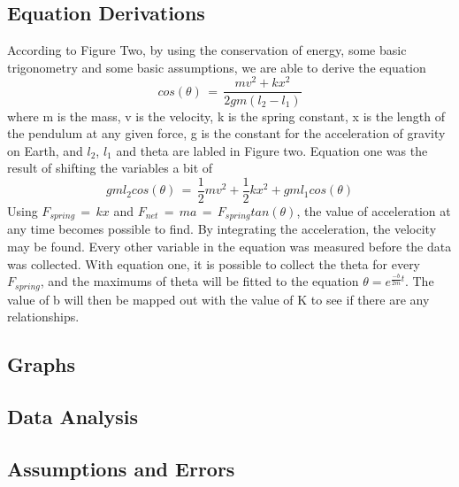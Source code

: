 \documentclass{report}
\begin{document}
\subsection*{Equation Derivations}
\indent According to Figure Two, by using the conservation of energy, some basic trigonometry and some basic assumptions, we are able to derive the equation
\begin{equation}
cos(\theta) \, = \,\frac{mv^2 + kx^2}{2gm(l_2 - l_1)}
\end{equation}
where m is the mass, v is the velocity, k is the spring constant, x is the length of the pendulum at any given force, g is the constant for the acceleration of gravity on Earth, and $l_2$, $l_1$ and theta are labled in Figure two. Equation one was the result of shifting the variables a bit of
\begin{equation}
gml_2cos(\theta) \, = \, \frac{1}{2}mv^2 + \frac{1}{2}kx^2 +gml_1cos(\theta)
\end{equation}
Using $F_{spring} \, = \, kx$ and $F_{net} \, = \, ma \, = \, F_{spring}tan(\theta)$, the value of acceleration at any time becomes possible to find. By integrating the acceleration, the velocity may be found. Every other variable in the equation was measured before the data was collected. With equation one, it is possible to collect the theta for every $F_{spring}$, and the maximums of theta will be fitted to the equation $\theta = e^{\frac{-b}{2m}t}$. The value of b will then be mapped out with the value of K to see if there are any relationships.
\subsection*{Graphs}

\subsection*{Data Analysis}

\subsection*{Assumptions and Errors}
\end{document}
